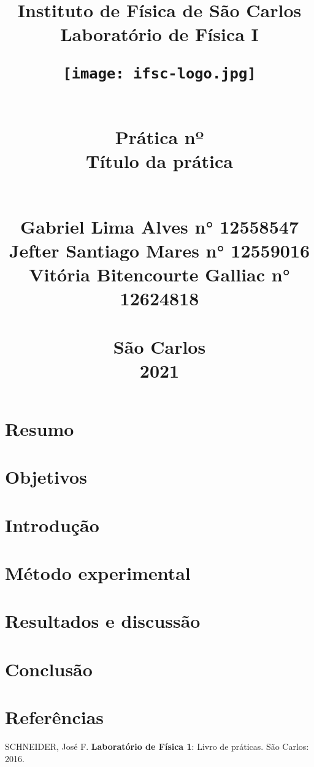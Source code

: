 \documentclass[a4paper, 12pt]{article}
\title{
   \begin{center}
        \Huge{
        \textbf{Instituto de Física de São Carlos \\
        Laboratório de Física I}
        \vspace{1em}
        \begin{figure}[h]
  \begin{center}
      \texttt{[image: ifsc-logo.jpg]}
   \end{center}
\end{figure}
       \vspace{0.5em} \\
        \Large{Prática nº}
        \vspace{0.5em} \\
       \large{ Título da prática}
        }
        \vspace*{\fill}
        \large{
        \\ Gabriel Lima Alves  n° 12558547 \\
        Jefter Santiago Mares n° 12559016 \\
        Vitória Bitencourte Galliac n° 12624818 \\
        }
        \vspace*{\fill}
      \\São Carlos \\  2021
\newpage
\end{center}}
\date{}
\begin{document}
\maketitle
\section{Resumo}
\section{Objetivos}
\section{Introdução}
\section{Método experimental}
\section{Resultados e discussão}
\section{Conclusão}
\section{Referências}
SCHNEIDER, José F. \textbf{Laboratório de Física 1}: Livro de práticas. São Carlos: 2016.
\end{document}
